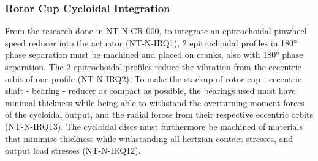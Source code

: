 \documentclass[confidential]{../../../classes/nervtech-engdoc}
\begin{document}
\subsubsection{Rotor Cup Cycloidal Integration}
From the research done in NT-N-CR-000, to integrate an epitrochoidal-pinwheel speed reducer into the actuator (NT-N-IRQ1), 2 epitrochoidal profiles in 180° phase separation must be machined and placed on cranks, also with 180° phase separation.
The 2 epitrochoidal profiles reduce the vibration from the eccentric orbit of one profile (NT-N-IRQ2).
To make the stackup of rotor cup - eccentric shaft - bearing - reducer as compact as possible, the bearings used must have minimal thickness while being able to withstand the overturning moment forces of the cycloidal output, and the radial forces from their respective eccentric orbits (NT-N-IRQ13).
The cycloidal discs must furthermore be machined of materials that minimise thickness while withstanding all hertzian contact stresses, and output load stresses (NT-N-IRQ12).
\end{document}
